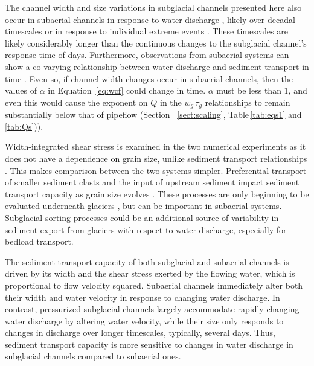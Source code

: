 \documentclass[tc, manuscript]{copernicus}
\begin{document}
The channel width and size variations in subglacial channels presented here also occur in subaerial channels in response to water discharge \citep{phillips2016}, likely over decadal timescales or in response to individual extreme events \citep[e.g.][]{slater2013,dean2013}.
These timescales are likely considerably longer than the continuous changes to the subglacial channel's response time of days.
Furthermore, observations from subaerial systems can show a co-varying relationship between water discharge and sediment transport in time \citep[e.g.][]{schmidt2006,pitlick2021}.
Even so, if channel width changes occur in subaerial channels, then the values of $\alpha$ in Equation~\ref{eq:wcf} could change in time.
$\alpha$ must be less than $1$, and even this would cause the exponent on $Q$ in the  $w_g\,\tau_{g}$ relationships to remain substantially below that of pipeflow (Section ~\ref{sect:scaling}, Table\,\ref{tab:eqs1} and \ref{tab:Qs})).

Width-integrated shear stress is examined in the two numerical experiments as it does not have a dependence on grain size, unlike sediment transport relationships \citep[][Section \ref{sect:scaling}]{meyer1948}.
This makes comparison between the two systems simpler. 
Preferential transport of smaller sediment clasts and the input of upstream sediment impact sediment transport capacity as grain size evolves \citep[e.g.][]{gomez1983}.
These processes are only beginning to be evaluated underneath glaciers \citep{aitken2024}, but can be important in subaerial systems.
Subglacial sorting processes could be an additional source of variability in sediment export from glaciers with respect to water discharge, especially for bedload transport.

\conclusions

The sediment transport capacity of both subglacial and subaerial channels is driven by its width and the shear stress exerted by the flowing water, which is proportional to flow velocity squared.
Subaerial channels immediately alter both their width and water velocity in response to changing water discharge.
In contrast, pressurized subglacial channels largely accommodate rapidly changing water discharge by altering water velocity, while their size only responds to changes in discharge over longer timescales, typically, several days.
Thus, sediment transport capacity is more sensitive to changes in water discharge in subglacial channels compared to subaerial ones.
\end{document}
